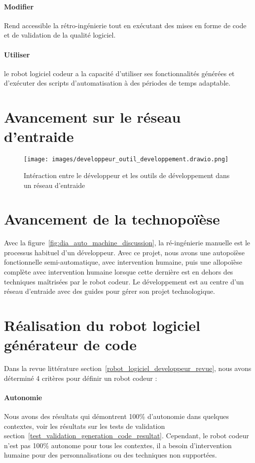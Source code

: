 \paragraph{Modifier}
Rend accessible la rétro-ingénierie tout en exécutant des mises en forme de code et de validation de la qualité logiciel.

\paragraph{Utiliser}
le robot logiciel codeur a la capacité d’utiliser ses fonctionnalités générées et d’exécuter des scripts d’automatisation à des périodes de temps adaptable.

\section{Avancement sur le réseau d'entraide}

\begin{figure}
\centering
\texttt{[image: images/developpeur\_outil\_developpement.drawio.png]}
\caption{Intéraction entre le développeur et les outils de développement dans un réseau d'entraide}
\label{fig:dia_outil_dev_reseau_entraide}
\end{figure}

\section{Avancement de la technopoïèse}
Avec la figure~\ref{fig:dia_auto_machine_discussion}, la ré-ingénierie manuelle est le processus habituel d'un développeur. Avec ce projet, nous avons une autopoïèse fonctionnelle semi-automatique, avec intervention humaine, puis une allopoïèse complète avec intervention humaine lorsque cette dernière est en dehors des techniques maîtrisées par le robot codeur. Le développement est au centre d'un réseau d'entraide avec des guides pour gérer son projet technologique.

\section{Réalisation du robot logiciel générateur de code}
Dans la revue littérature section~\ref{robot_logiciel_developpeur_revue}, nous avons déterminé 4 critères pour définir un robot codeur :
\paragraph{Autonomie}
Nous avons des résultats qui démontrent 100\% d'autonomie dans quelques contextes, voir les résultats sur les tests de validation section~\ref{test_validation_generation_code_resultat}. Cependant, le robot codeur n'est pas 100\% autonome pour tous les contextes, il a besoin d'intervention humaine pour des personnalisations ou des techniques non supportées.

